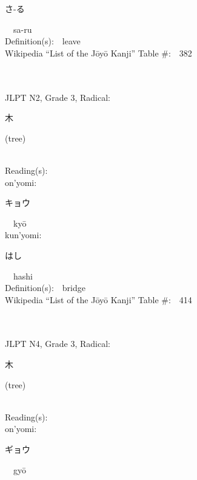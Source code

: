 \begin{multicols}{2}
{\hspace*{2em}}{\begin{CJK}{UTF8}{min} さ-る \end{CJK}}\ \ sa-ru\ \ \\
Definition(s):\ \ leave \\
Wikipedia ``List of the J\=oy\=o Kanji'' Table \#:\ \ 382 \\
\ \ \\
{\fontsize{34pt}{40pt}  }\ \ \\  %
{JLPT N2, Grade 3, Radical:\ \ {\begin{CJK}{UTF8}{min} 木 \end{CJK}} (tree) } \\
Reading(s):\ \ \\
{\hspace*{1em}}on'yomi:\ \ \\
{\hspace*{2em}}{\begin{CJK}{UTF8}{min} キョウ \end{CJK}}\ \ ky\=o\ \ \\
{\hspace*{1em}}kun'yomi:\ \ \\
{\hspace*{2em}}{\begin{CJK}{UTF8}{min} はし \end{CJK}}\ \ hashi\ \ \\
Definition(s):\ \ bridge \\
Wikipedia ``List of the J\=oy\=o Kanji'' Table \#:\ \ 414 \\
\ \ \\
{\fontsize{34pt}{40pt}  }\ \ \\  %
{JLPT N4, Grade 3, Radical:\ \ {\begin{CJK}{UTF8}{min} 木 \end{CJK}} (tree) } \\
Reading(s):\ \ \\
{\hspace*{1em}}on'yomi:\ \ \\
{\hspace*{2em}}{\begin{CJK}{UTF8}{min} ギョウ \end{CJK}}\ \ gy\=o\ \ \\

\end{multicols}
